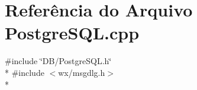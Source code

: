 \section{Referência do Arquivo Postgre\+S\+Q\+L.\+cpp}
\label{_postgre_s_q_l_8cpp}
{\ttfamily \#include \char`\"{}D\+B/\+Postgre\+S\+Q\+L.\+h\char`\"{}}\\*
{\ttfamily \#include $<$wx/msgdlg.\+h$>$}\\*
